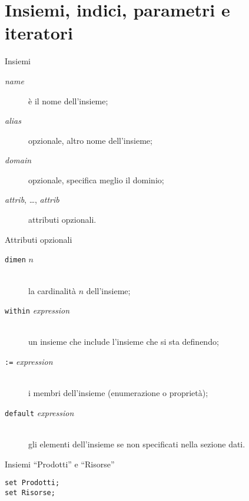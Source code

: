 \documentclass{beamer}
\begin{document}
\section{Insiemi, indici, parametri e iteratori}

\begin{frame}{Insiemi}


\begin{description}

\item[{\it name}] \`e il nome dell'insieme;

\item[{\it alias}] opzionale, altro nome dell'insieme;

\item[{\it domain}] opzionale, specifica meglio il dominio;

\item[{\it attrib}, \dots, {\it attrib}] attributi opzionali.
\end{description}

\framebreak

{\small Attributi opzionali}

\vspace*{-8pt}

{\footnotesize \begin{description}
\item[{\tt dimen} $n$]\hspace*{0pt}\\
la cardinalit\`a $n$ dell'insieme;
\item[{\tt within} {\it expression}]\hspace*{0pt}\\
un insieme che include l'insieme che si sta definendo;
\item[{\tt:=} {\it expression}]\hspace*{0pt}\\
i membri dell'insieme (enumerazione o propriet\`a);
\item[{\tt default} {\it expression}]\hspace*{0pt}\\
gli elementi dell'insieme se
non specificati nella sezione dati.
\end{description}}

\begin{block}{Insiemi ``Prodotti'' e ``Risorse''}
\begin{lstlisting}
set Prodotti;
set Risorse;
\end{lstlisting}
\end{block}
\end{frame}
\end{document}
